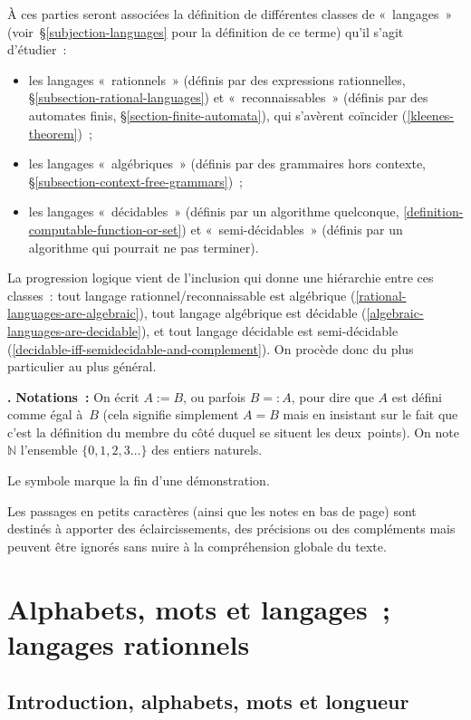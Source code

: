 \documentclass[12pt,a4paper]{article}
\theoremstyle{definition}
\newcommand\thingy{%
\refstepcounter{comcnt}\medskip\noindent\textbf{\thecomcnt.} }
\renewcommand{\qedsymbol}{\smiley}
\begin{document}
\smallbreak

À ces parties seront associées la définition de différentes classes de
« langages » (voir §\ref{subjection-languages} pour la définition de
ce terme) qu'il s'agit d'étudier :
\begin{itemize}
\item les langages « rationnels » (définis par des expressions
  rationnelles, §\ref{subsection-rational-languages}) et
  « reconnaissables » (définis par des automates finis,
  §\ref{section-finite-automata}), qui s'avèrent coïncider
  (\ref{kleenes-theorem}) ;
\item les langages « algébriques » (définis par des grammaires hors
  contexte, §\ref{subsection-context-free-grammars}) ;
\item les langages « décidables » (définis par un algorithme
  quelconque, \ref{definition-computable-function-or-set}) et
  « semi-décidables » (définis par un algorithme qui pourrait ne pas
  terminer).
\end{itemize}
La progression logique vient de l'inclusion qui donne une hiérarchie
entre ces classes : tout langage rationnel/reconnaissable est
algébrique (\ref{rational-languages-are-algebraic}), tout langage
algébrique est décidable (\ref{algebraic-languages-are-decidable}), et
tout langage décidable est semi-décidable
(\ref{decidable-iff-semidecidable-and-complement}).  On procède donc
du plus particulier au plus général.

\thingy \textbf{Notations :} On écrit $A:=B$, ou parfois $B=:A$, pour
dire que $A$ est défini comme égal à $B$ (cela signifie simplement
$A=B$ mais en insistant sur le fait que c'est la définition du membre
du côté duquel se situent les deux points).  On note $\mathbb{N}$
l'ensemble $\{0,1,2,3\ldots\}$ des entiers naturels.

Le symbole \qedsymbol{} marque la fin d'une démonstration.

Les passages en petits caractères (ainsi que les notes en bas de page)
sont destinés à apporter des éclaircissements, des précisions ou des
compléments mais peuvent être ignorés sans nuire à la compréhension
globale du texte.

\section{Alphabets, mots et langages ; langages rationnels}\label{section-languages-and-rational-languages}

\subsection{Introduction, alphabets, mots et longueur}\label{subsection-introduction-and-words}
\end{document}

